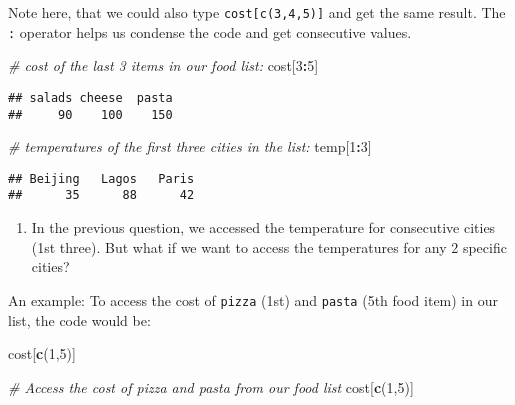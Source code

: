 \documentclass[]{article}
\newenvironment{Shaded}{\begin{snugshade}}{\end{snugshade}}
\newcommand{\CommentTok}[1]{\textcolor[rgb]{0.56,0.35,0.01}{\textit{#1}}}
\newcommand{\DecValTok}[1]{\textcolor[rgb]{0.00,0.00,0.81}{#1}}
\newcommand{\KeywordTok}[1]{\textcolor[rgb]{0.13,0.29,0.53}{\textbf{#1}}}
\newcommand{\NormalTok}[1]{#1}
\newcommand{\OperatorTok}[1]{\textcolor[rgb]{0.81,0.36,0.00}{\textbf{#1}}}
\providecommand{\tightlist}{%
  \setlength{\itemsep}{0pt}\setlength{\parskip}{0pt}}
\begin{document}
Note here, that we could also type \texttt{cost{[}c(3,4,5){]}} and get
the same result. The \texttt{:} operator helps us condense the code and
get consecutive values.

\begin{Shaded}
\begin{Highlighting}[]
\CommentTok{# cost of the last 3 items in our food list:}
\NormalTok{cost[}\DecValTok{3}\OperatorTok{:}\DecValTok{5}\NormalTok{]}
\end{Highlighting}
\end{Shaded}

\begin{verbatim}
## salads cheese  pasta 
##     90    100    150
\end{verbatim}

\begin{Shaded}
\begin{Highlighting}[]
\CommentTok{# temperatures of the first three cities in the list:}
\NormalTok{temp[}\DecValTok{1}\OperatorTok{:}\DecValTok{3}\NormalTok{]}
\end{Highlighting}
\end{Shaded}

\begin{verbatim}
## Beijing   Lagos   Paris 
##      35      88      42
\end{verbatim}

\begin{enumerate}
\def\labelenumi{\arabic{enumi}.}
\setcounter{enumi}{4}
\tightlist
\item
  In the previous question, we accessed the temperature for consecutive
  cities (1st three). But what if we want to access the temperatures for
  any 2 specific cities?
\end{enumerate}

An example: To access the cost of \texttt{pizza} (1st) and
\texttt{pasta} (5th food item) in our list, the code would be:

\begin{Shaded}
\begin{Highlighting}[]
\NormalTok{cost[}\KeywordTok{c}\NormalTok{(}\DecValTok{1}\NormalTok{,}\DecValTok{5}\NormalTok{)]}
\end{Highlighting}
\end{Shaded}

\begin{Shaded}
\begin{Highlighting}[]
\CommentTok{# Access the cost of pizza and pasta from our food list }
\NormalTok{cost[}\KeywordTok{c}\NormalTok{(}\DecValTok{1}\NormalTok{,}\DecValTok{5}\NormalTok{)]}
\end{Highlighting}
\end{Shaded}
\end{document}
